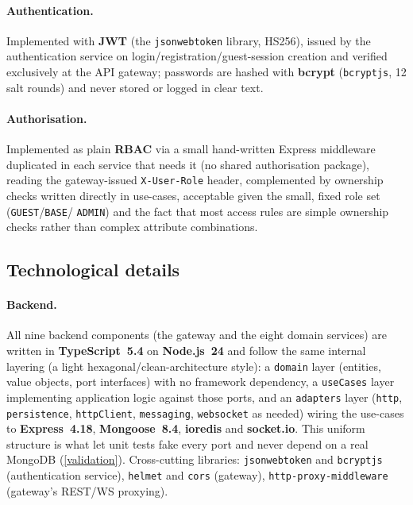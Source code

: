 \paragraph{Authentication.} Implemented with \textbf{JWT} (the
\texttt{jsonwebtoken} library, HS256), issued by the authentication service on
login/registration/guest-session creation and verified exclusively at the API
gateway; passwords are hashed with \textbf{bcrypt}
(\texttt{bcryptjs}, 12 salt rounds) and never stored or logged in clear text.

\paragraph{Authorisation.} Implemented as plain \textbf{RBAC} via a small
hand-written Express middleware duplicated in each service that needs it (no
shared authorisation package), reading the gateway-issued
\texttt{X-User-Role} header, complemented by ownership checks written
directly in use-cases,
acceptable given the small, fixed role set (\texttt{GUEST}/\texttt{BASE}/
\texttt{ADMIN}) and the fact that most access rules are simple ownership
checks rather than complex attribute combinations.

\subsection{Technological details}\label{technological-details}

\paragraph{Backend.} All nine backend components (the gateway and the eight
domain services) are written in \textbf{TypeScript~5.4} on \textbf{Node.js~24}
and follow the same internal layering (a light hexagonal/clean-architecture
style): a \texttt{domain} layer (entities, value objects, port interfaces)
with no framework dependency, a \texttt{useCases} layer implementing
application logic against those ports, and an \texttt{adapters} layer
(\texttt{http}, \texttt{persistence}, \texttt{httpClient}, \texttt{messaging},
\texttt{websocket} as needed) wiring the use-cases to \textbf{Express~4.18},
\textbf{Mongoose~8.4}, \textbf{ioredis} and \textbf{socket.io}. This uniform
structure is what let unit tests fake every port and never depend on a real
MongoDB (\cref{validation}). Cross-cutting libraries: \texttt{jsonwebtoken}
and \texttt{bcryptjs} (authentication service), \texttt{helmet} and
\texttt{cors} (gateway), \texttt{http-proxy-middleware} (gateway's REST/WS
proxying).

